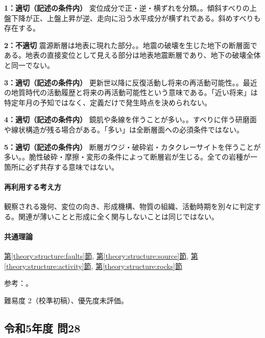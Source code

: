 \noindent\textbf{1：適切（記述の条件内）} 変位成分で正・逆・横ずれを分類。。傾斜すべりの上盤下降が正、上盤上昇が逆、走向に沿う水平成分が横ずれである。斜めすべりも存在する。\par

\noindent\textbf{2：不適切} 震源断層は地表に現れた部分。。地震の破壊を生じた地下の断層面である。地表の直接変位として見える部分は地表地震断層であり、地下の破壊全体と同一でない。\par

\noindent\textbf{3：適切（記述の条件内）} 更新世以降に反復活動し将来の再活動可能性。。最近の地質時代の活動履歴と将来の再活動可能性という意味である。「近い将来」は特定年月の予知ではなく、定義だけで発生時点を決められない。\par

\noindent\textbf{4：適切（記述の条件内）} 鏡肌や条線を伴うことが多い。。すべりに伴う研磨面や線状構造が残る場合がある。「多い」は全断層面への必須条件ではない。\par

\noindent\textbf{5：適切（記述の条件内）} 断層ガウジ・破砕岩・カタクレーサイトを伴うことが多い。。脆性破砕・摩擦・変形の条件によって断層岩が生じる。全ての岩種が一箇所に必ず共存する意味ではない。\par

\paragraph{再利用する考え方} 観察される幾何、変位の向き、形成機構、物質の組織、活動時期を別々に判定する。関連が薄いことと形成に全く関与しないことは同じではない。

\paragraph{共通理論} \hyperref[theory:structure:faults]{第\ref*{theory:structure:faults}節}, \hyperref[theory:structure:source]{第\ref*{theory:structure:source}節}, \hyperref[theory:structure:activity]{第\ref*{theory:structure:activity}節}, \hyperref[theory:structure:rocks]{第\ref*{theory:structure:rocks}節}

\par 参考：\cite{str_source,str_faultrocks,str_activity}。

\par 難易度 2（校準初稿）、優先度未評価。

\subsection{令和5年度 問28}
\label{q:r05-reg-applied-28}

